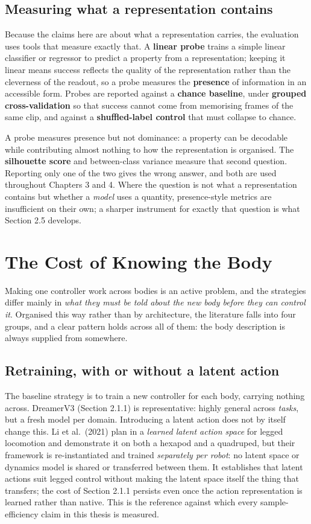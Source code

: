 \documentclass[12pt,a4paper,oneside]{report}
\begin{document}
\subsection{Measuring what a representation contains}
Because the claims here are about what a representation carries, the evaluation uses tools that
measure exactly that. A \textbf{linear probe} trains a simple linear classifier or regressor to
predict a property from a representation; keeping it linear means success reflects the quality of the
representation rather than the cleverness of the readout, so a probe measures the \textbf{presence} of
information in an accessible form. Probes are reported against a \textbf{chance baseline}, under
\textbf{grouped cross-validation} so that success cannot come from memorising frames of the same clip,
and against a \textbf{shuffled-label control} that must collapse to chance.

A probe measures presence but not dominance: a property can be decodable while contributing almost
nothing to how the representation is organised. The \textbf{silhouette score} and between-class
variance measure that second question. Reporting only one of the two gives the wrong answer, and both
are used throughout Chapters 3 and 4. Where the question is not what a representation contains but
whether a \emph{model} uses a quantity, presence-style metrics are insufficient on their own; a
sharper instrument for exactly that question is what Section 2.5 develops.

\section{The Cost of Knowing the Body}
Making one controller work across bodies is an active problem, and the strategies differ mainly in
\emph{what they must be told about the new body before they can control it}. Organised this way rather
than by architecture, the literature falls into four groups, and a clear pattern holds across all of
them: the body description is always supplied from somewhere.

\subsection{Retraining, with or without a latent action}
The baseline strategy is to train a new controller for each body, carrying nothing across. DreamerV3
(Section 2.1.1) is representative: highly general across \emph{tasks}, but a fresh model per domain.
Introducing a latent action does not by itself change this. Li et al.\ (2021) plan in a
\emph{learned latent action space} for legged locomotion and demonstrate it on both a hexapod and a
quadruped, but their framework is re-instantiated and trained \emph{separately per robot}: no latent
space or dynamics model is shared or transferred between them. It establishes that latent actions
suit legged control without making the latent space itself the thing that transfers; the cost of
Section 2.1.1 persists even once the action representation is learned rather than native. This is the
reference against which every sample-efficiency claim in this thesis is measured.
\end{document}
